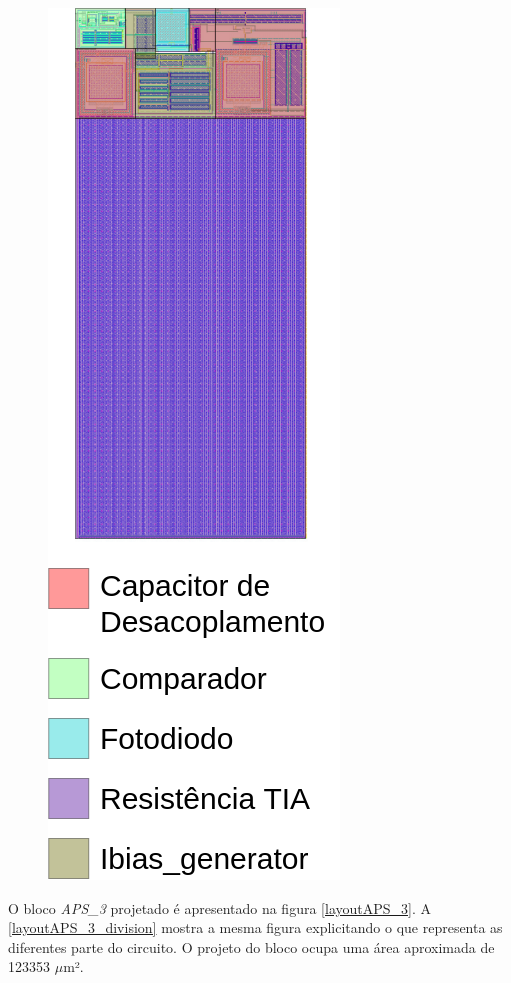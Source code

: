\begin{figure}[htb]
\begin{minipage}{0.4\textwidth}
    \includegraphics[scale=0.4]{Resultados/Imagens/Image_TIA.png}
    \label{layoutTIA_division}
    \end{minipage}
\end{figure}

O bloco \textit{APS\_3} projetado é apresentado na figura \autoref{layoutAPS_3}. A \autoref{layoutAPS_3_division} mostra a mesma figura explicitando o que representa as diferentes parte do circuito. O projeto do bloco ocupa uma área aproximada de 123353 $\mu$m².

